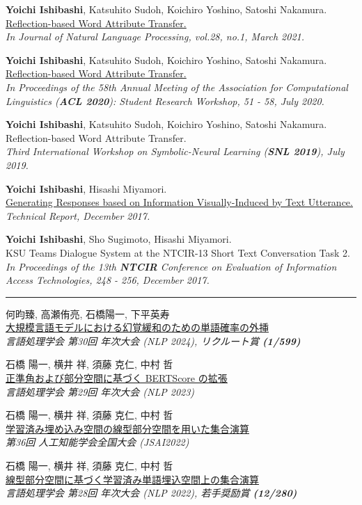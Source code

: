 \documentclass[11pt,a4paper]{article}
\let\oldhref\href
\renewcommand{\href}[2]{\oldhref{#1}{\uline{#2}}}
\newlength{\labelcol}\setlength{\labelcol}{1.2in}
\newlength{\labelgap}\setlength{\labelgap}{0.21in}
\newcommand{\cvsection}[1]{%
  \par\vspace{26pt}%
  {\noindent\rule{\textwidth}{2.4pt}\par}\nopagebreak\vspace{9pt}%
  \noindent\llap{\smash[b]{\parbox[t]{\labelcol}{\raggedright\large\bfseries #1}}\hspace{\labelgap}}\ignorespaces}
\newcommand{\paper}[3]{\par\vspace{12pt}\noindent #1\\ #2\\ {\itshape #3}\par}
\newcommand{\paperfirst}[3]{#1\\ #2\\ {\itshape #3}\par}
\begin{document}
\paper{\textbf{Yoichi Ishibashi}, Katsuhito Sudoh, Koichiro Yoshino, Satoshi Nakamura.}
{\href{https://www.jstage.jst.go.jp/article/jnlp/28/1/28_206/_article/-char/en}{Reflection-based Word Attribute Transfer.}}
{In Journal of Natural Language Processing, vol.28, no.1, March 2021.}

\paper{\textbf{Yoichi Ishibashi}, Katsuhito Sudoh, Koichiro Yoshino, Satoshi Nakamura.}
{\href{https://www.aclweb.org/anthology/2020.acl-srw.8/}{Reflection-based Word Attribute Transfer.}}
{In Proceedings of the 58th Annual Meeting of the Association for Computational Linguistics (\textbf{ACL 2020}): Student Research Workshop, 51 - 58, July 2020.}

\paper{\textbf{Yoichi Ishibashi}, Katsuhito Sudoh, Koichiro Yoshino, Satoshi Nakamura.}
{Reflection-based Word Attribute Transfer.}
{Third International Workshop on Symbolic-Neural Learning (\textbf{SNL 2019}), July 2019.}

\paper{\textbf{Yoichi Ishibashi}, Hisashi Miyamori.}
{\href{https://yoichi1484.github.io/projects/shizuka/doc/INLG2019/paper/paper_final2019.pdf}{Generating Responses based on Information Visually-Induced by Text Utterance.}}
{Technical Report, December 2017.}

\paper{\textbf{Yoichi Ishibashi}, Sho Sugimoto, Hisashi Miyamori.}
{KSU Teams Dialogue System at the NTCIR-13 Short Text Conversation Task 2.}
{In Proceedings of the 13th \textbf{NTCIR} Conference on Evaluation of Information Access Technologies, 248 - 256, December 2017.}

\cvsection{国内発表}%
\paperfirst{何昀臻, 高瀬侑亮, 石橋陽一, 下平英寿}
{\href{https://www.anlp.jp/proceedings/annual_meeting/2024/pdf_dir/P6-21.pdf}{大規模言語モデルにおける幻覚緩和のための単語確率の外挿}}
{\upshape 言語処理学会 第30回 年次大会 (NLP 2024), リクルート賞 \textbf{(1/599)}}

\paper{石橋 陽一, 横井 祥, 須藤 克仁, 中村 哲}
{\href{https://www.anlp.jp/proceedings/annual_meeting/2023/pdf_dir/C4-1.pdf}{正準角および部分空間に基づく BERTScore の拡張}}
{\upshape 言語処理学会 第29回 年次大会 (NLP 2023)}

\paper{石橋 陽一, 横井 祥, 須藤 克仁, 中村 哲}
{\href{https://www.jstage.jst.go.jp/article/pjsai/JSAI2022/0/JSAI2022_1P4GS602/_article/-char/en}{学習済み埋め込み空間の線型部分空間を用いた集合演算}}
{\upshape 第36回 人工知能学会全国大会 (JSAI2022)}

\paper{石橋 陽一, 横井 祥, 須藤 克仁, 中村 哲}
{\href{https://www.anlp.jp/proceedings/annual_meeting/2022/pdf_dir/PH2-8.pdf}{線型部分空間に基づく学習済み単語埋込空間上の集合演算}}
{\upshape 言語処理学会 第28回 年次大会 (NLP 2022), 若手奨励賞 \textbf{(12/280)}}
\end{document}
